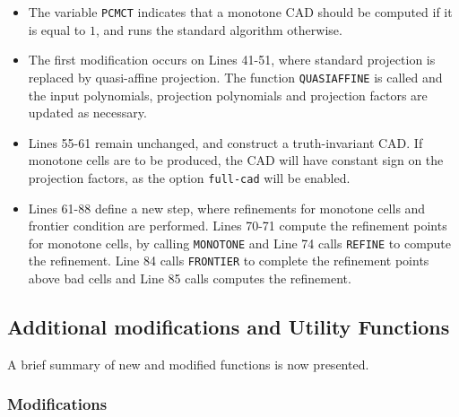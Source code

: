 \documentclass[
]{book}
\providecommand{\tightlist}{%
  \setlength{\itemsep}{0pt}\setlength{\parskip}{0pt}}
\theoremstyle{definition}
\theoremstyle{definition}
\theoremstyle{definition}
\theoremstyle{definition}
\theoremstyle{remark}
\begin{document}
\begin{itemize}
\tightlist
\item
  The variable \texttt{PCMCT} indicates that a monotone CAD should be computed if it is equal to \(1\), and runs the standard algorithm otherwise.
\item
  The first modification occurs on Lines 41-51, where standard projection is replaced by quasi-affine projection. The function \texttt{QUASIAFFINE} is called and the input polynomials, projection polynomials and projection factors are updated as necessary.
\item
  Lines 55-61 remain unchanged, and construct a truth-invariant CAD. If monotone cells are to be produced, the CAD will have constant sign on the projection factors, as the option \texttt{full-cad} will be enabled.
\item
  Lines 61-88 define a new step, where refinements for monotone cells and frontier condition are performed. Lines 70-71 compute the refinement points for monotone cells, by calling \texttt{MONOTONE} and Line 74 calls \texttt{REFINE} to compute the refinement. Line 84 calls \texttt{FRONTIER} to complete the refinement points above bad cells and Line 85 calls computes the refinement.
\end{itemize}

\hypertarget{additional-modifications-and-utility-functions}{%
\subsection{Additional modifications and Utility Functions}\label{additional-modifications-and-utility-functions}}

A brief summary of new and modified functions is now presented.

\hypertarget{modifications}{%
\subsubsection{Modifications}\label{modifications}}
\end{document}

